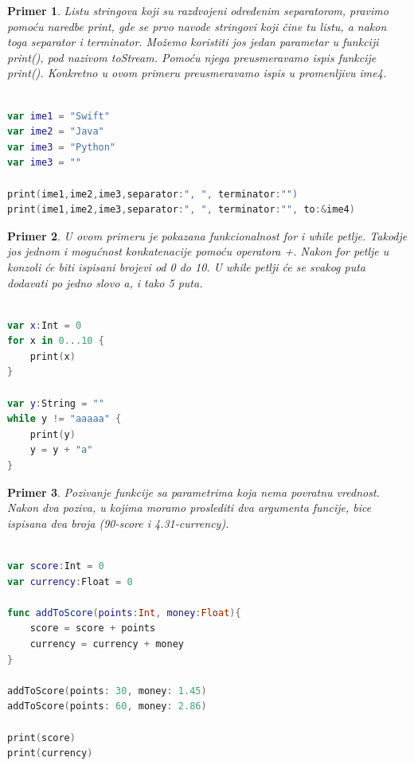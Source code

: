 \documentclass[a4paper]{article}
\newtheorem{primer}{Primer}[section]
\begin{document}
\begin{primer}
Listu stringova koji su razdvojeni određenim separatorom, pravimo pomoću naredbe print, gde se prvo navode stringovi koji čine tu listu, a nakon toga separator i terminator. Možemo koristiti jos jedan parametar u funkciji print(), pod nazivom toStream. Pomoću njega preusmeravamo ispis funkcije print(). Konkretno u ovom primeru preusmeravamo ispis u promenljivu ime4.
\end{primer}
\begin{lstlisting}[language=Swift, caption={Lista stringova},frame=single, label=simple]

var ime1 = "Swift"
var ime2 = "Java"
var ime3 = "Python"
var ime3 = ""

print(ime1,ime2,ime3,separator:", ", terminator:"")
print(ime1,ime2,ime3,separator:", ", terminator:"", to:&ime4)

\end{lstlisting}

\begin{primer}
U ovom primeru je pokazana funkcionalnost for i while petlje. Takodje jos jednom i mogućnost konkatenacije pomoću operatora +. Nakon for petlje u konzoli će biti ispisani brojevi od 0 do 10. U while petlji će se svakog puta dodavati po jedno slovo a, i tako 5 puta.
\end{primer}

\begin{lstlisting}[language=Swift, caption={Petlje},frame=single, label=simple]

var x:Int = 0
for x in 0...10 {
	print(x)
}

var y:String = ""
while y != "aaaaa" {
	print(y)
	y = y + "a"
}

\end{lstlisting}

\begin{primer}
Pozivanje funkcije sa parametrima koja nema povratnu vrednost. Nakon dva poziva, u kojima moramo proslediti dva argumenta funcije, bice ispisana dva broja (90-score i 4.31-currency).
\end{primer}

\begin{lstlisting}[language=Swift, caption={Funkcije bez povratne vrednosti},frame=single, label=simple]

var score:Int = 0
var currency:Float = 0

func addToScore(points:Int, money:Float){
	score = score + points
	currency = currency + money
}

addToScore(points: 30, money: 1.45)
addToScore(points: 60, money: 2.86)

print(score)
print(currency)

\end{lstlisting}
\end{document}

